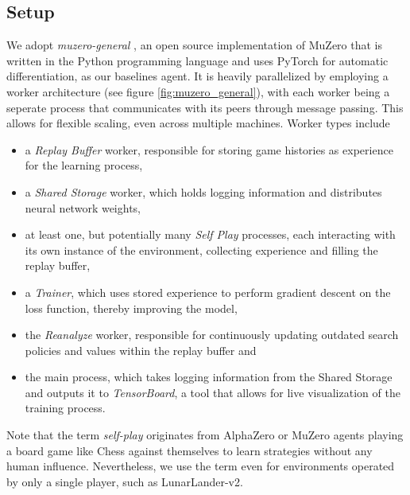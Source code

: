 \subsection{Setup}
We adopt \textit{muzero-general} \cite{muzero-general}, an open source implementation of MuZero that is written in the Python programming language and uses PyTorch for automatic differentiation, as our baselines agent. It is heavily parallelized by employing a worker architecture (see figure \ref{fig:muzero_general}), with each worker being a seperate process that communicates with its peers through message passing. This allows for flexible scaling, even across multiple machines. Worker types include
\begin{itemize}
    \item a \textit{Replay Buffer} worker, responsible for storing game histories as experience for the learning process,
    \item a \textit{Shared Storage} worker, which holds logging information and distributes neural network weights,
    \item at least one, but potentially many \textit{Self Play} processes, each interacting with its own instance of the environment, collecting experience and filling the replay buffer,
    \item a \textit{Trainer}, which uses stored experience to perform gradient descent on the loss function, thereby improving the model,
    \item the \textit{Reanalyze} worker, responsible for continuously updating outdated search policies and values within the replay buffer and
    \item the main process, which takes logging information from the Shared Storage and outputs it to \textit{TensorBoard}, a tool that allows for live visualization of the training process.
\end{itemize}
Note that the term \textit{self-play} originates from AlphaZero or MuZero agents playing a board game like Chess against themselves to learn strategies without any human influence. Nevertheless, we use the term even for environments operated by only a single player, such as LunarLander-v2.
